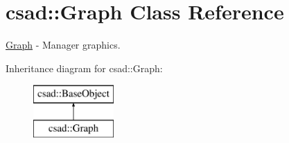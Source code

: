 \hypertarget{classcsad_1_1_graph}{\section{csad\-:\-:Graph Class Reference}
\label{classcsad_1_1_graph}
}


\hyperlink{classcsad_1_1_graph}{Graph} -\/ Manager graphics.  


Inheritance diagram for csad\-:\-:Graph\-:\begin{figure}[H]
\begin{center}
\leavevmode
\includegraphics[height=2.000000cm]{classcsad_1_1_graph}
\end{center}
\end{figure}
